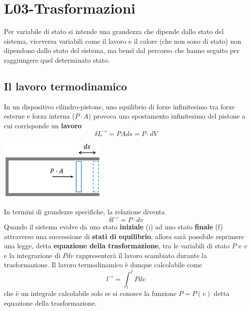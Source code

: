 \section{L03-Trasformazioni}
Per variabile di stato si intende una grandezza che dipende dallo stato del sistema, viceversa variabili come il lavoro e il calore (che non sono di stato) non dipendono dallo stato del sistema, ma bensì dal percorso che hanno seguito per raggiungere quel determinato stato.
\subsection{Il lavoro termodinamico}
In un dispositivo cilindro-pistone, uno squilibrio di forze infinitesimo tra forze esterne e forza interna ($P \cdot A$) provoca uno spostamento infinitesimo del pistone a cui corrisponde un \textbf{lavoro}
\[
    \delta L^\rightarrow  = P A ds = P \cdot dV
\]
\begin{center}
    \includegraphics[height=3cm]{../L03/img1.PNG}
\end{center}
In termini di grandezze specifiche, la relazione diventa
\[
    \delta l^\rightarrow = P \cdot dv
\]
Quando il sistema evolve da uno stato \textbf{iniziale} (i) ad uno stato \textbf{finale} (f) attraverso una successione di \textbf{stati di equilibrio}, allora sarà possibile esprimere una legge, detta \textbf{equazione della trasformazione}, tra le variabili di stato $P$ e $v$ e la integrazione di $P dv$ rappresenterà il lavoro scambiato durante la trasformazione.\newline
Il lavoro termodinamico è dunque calcolabile come
\[
    l^\rightarrow = \int_{i}^{f}Pdv
\]
che è un integrale calcolabile solo se si conosce la funzione $P = P (v)$ detta equazione della trasformazione.
